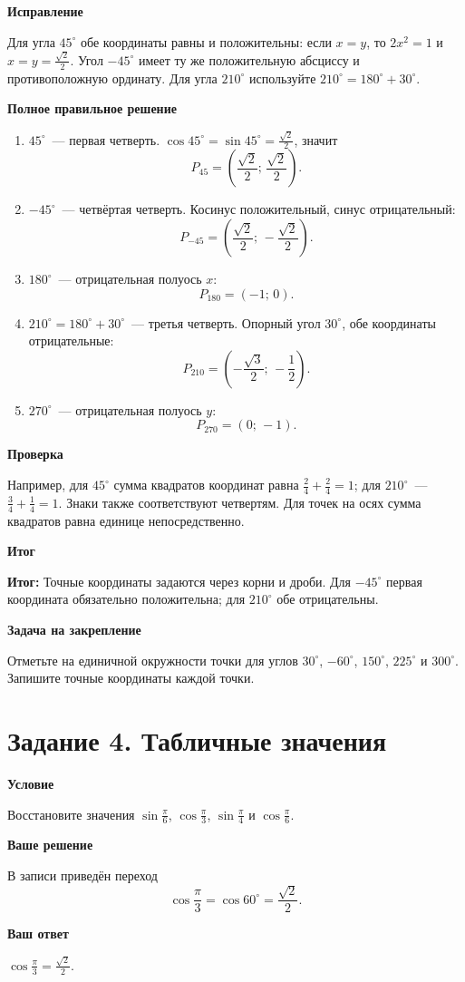 \documentclass[a4paper,12pt]{article}
\newcommand{\rubric}[1]{\par\medskip\textbf{#1}\par\nobreak}
\newcommand{\outcome}[1]{\textcolor{accent}{\textbf{Итог:}} #1}
\begin{document}
\rubric{Исправление}
Для угла $45^\circ$ обе координаты равны и положительны: если $x=y$, то $2x^2=1$ и $x=y=\frac{\sqrt2}{2}$. Угол $-45^\circ$ имеет ту же положительную абсциссу и противоположную ординату. Для угла $210^\circ$ используйте $210^\circ=180^\circ+30^\circ$.

\rubric{Полное правильное решение}
\begin{enumerate}
\item $45^\circ$~--- первая четверть. $\cos45^\circ=\sin45^\circ=\frac{\sqrt2}{2}$, значит
\[P_{45}=\left(\frac{\sqrt2}{2};\,\frac{\sqrt2}{2}\right).\]
\item $-45^\circ$~--- четвёртая четверть. Косинус положительный, синус отрицательный:
\[P_{-45}=\left(\frac{\sqrt2}{2};\,-\frac{\sqrt2}{2}\right).\]
\item $180^\circ$~--- отрицательная полуось $x$:
\[P_{180}=(-1;\,0).\]
\item $210^\circ=180^\circ+30^\circ$~--- третья четверть. Опорный угол $30^\circ$, обе координаты отрицательные:
\[P_{210}=\left(-\frac{\sqrt3}{2};\,-\frac12\right).\]
\item $270^\circ$~--- отрицательная полуось $y$:
\[P_{270}=(0;\,-1).\]
\end{enumerate}

\rubric{Проверка}
Например, для $45^\circ$ сумма квадратов координат равна $\frac24+\frac24=1$; для $210^\circ$~--- $\frac34+\frac14=1$. Знаки также соответствуют четвертям. Для точек на осях сумма квадратов равна единице непосредственно.

\rubric{Итог}
\outcome{Точные координаты задаются через корни и дроби. Для $-45^\circ$ первая координата обязательно положительна; для $210^\circ$ обе отрицательны.}

\rubric{Задача на закрепление}
Отметьте на единичной окружности точки для углов $30^\circ$, $-60^\circ$, $150^\circ$, $225^\circ$ и $300^\circ$. Запишите точные координаты каждой точки.

\clearpage
{}\label{task:4}
\section*{Задание 4. Табличные значения}
\rubric{Условие}
Восстановите значения $\sin\frac{\pi}{6}$, $\cos\frac{\pi}{3}$, $\sin\frac{\pi}{4}$ и $\cos\frac{\pi}{6}$.

\rubric{Ваше решение}
В записи приведён переход
\[\cos\frac{\pi}{3}=\cos60^\circ=\frac{\sqrt2}{2}.\]
\rubric{Ваш ответ}
$\displaystyle\cos\frac{\pi}{3}=\frac{\sqrt2}{2}$.
\end{document}
